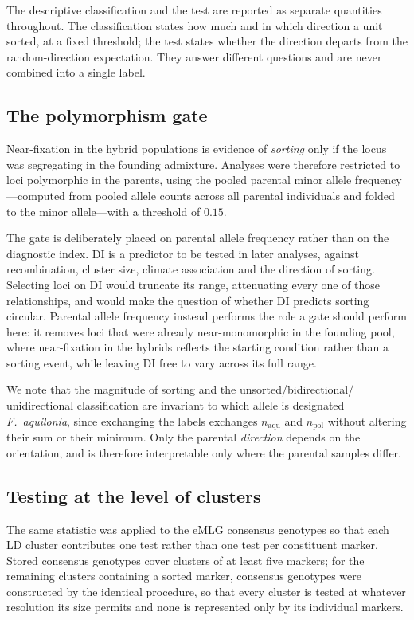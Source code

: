 \documentclass[11pt]{article}
\newcommand{\Faq}{\textit{F.~aquilonia}}
\begin{document}
The descriptive classification and the test are reported as separate
quantities throughout. The classification states how much and in which direction
a unit sorted, at a fixed threshold; the test states whether the direction
departs from the random-direction expectation. They answer different questions
and are never combined into a single label.

\subsection{The polymorphism gate}
Near-fixation in the hybrid populations is evidence of \emph{sorting} only if the
locus was segregating in the founding admixture. Analyses were therefore
restricted to loci polymorphic in the parents, using the pooled parental minor
allele frequency---computed from pooled allele counts across all parental
individuals and folded to the minor allele---with a threshold of $0.15$.

The gate is deliberately placed on parental allele frequency rather than on the
diagnostic index. DI is a predictor to be tested in later analyses, against
recombination, cluster size, climate association and the direction of sorting.
Selecting loci on DI would truncate its range, attenuating every one of those
relationships, and would make the question of whether DI predicts sorting
circular. Parental allele frequency instead performs the role a gate should
perform here: it removes loci that were already near-monomorphic in the founding
pool, where near-fixation in the hybrids reflects the starting condition rather
than a sorting event, while leaving DI free to vary across its full range.

We note that the magnitude of sorting and the unsorted/bidirectional/
unidirectional classification are invariant to which allele is designated
\Faq{}, since exchanging the labels exchanges $n_{\mathrm{aqu}}$ and
$n_{\mathrm{pol}}$ without altering their sum or their minimum. Only the parental
\emph{direction} depends on the orientation, and is therefore interpretable only
where the parental samples differ.

\subsection{Testing at the level of clusters}
The same statistic was applied to the eMLG consensus genotypes so that each LD
cluster contributes one test rather than one test per constituent marker. Stored
consensus genotypes cover clusters of at least five markers; for the remaining
clusters containing a sorted marker, consensus genotypes were constructed by the
identical procedure, so that every cluster is tested at whatever resolution its
size permits and none is represented only by its individual markers.
\end{document}
